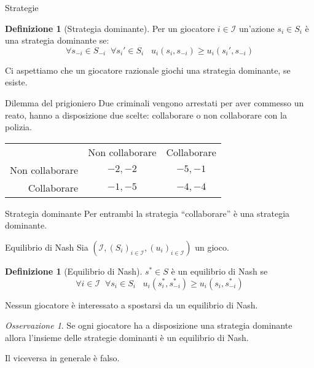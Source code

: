 \documentclass{beamer}
\newcounter{counter1}
\theoremstyle{plain}
\theoremstyle{definition}
\newtheorem{mydef}[counter1]{Definizione}
\theoremstyle{remark}
\newtheorem{myoss}[counter1]{Osservazione}
\newcommand{\pa}[1]{\left(#1\right)}
\begin{document}
\begin{frame}{Strategie}
  \begin{mydef}[Strategia dominante]
    Per un giocatore $i\in\mathcal{I}$ un'azione $s_i\in S_i$ è una
    strategia dominante se:
    \[ \forall s_{-i} \in S_{-i}\;\; \forall s_i' \in S_i\;\;\;
      u_i\pa{s_i,s_{-i}} \ge u_i\pa{s_i',s_{-i}} \]
  \end{mydef}

  Ci aspettiamo che un giocatore razionale giochi una strategia
  dominante, se esiste.
\end{frame}

\begin{frame}{Dilemma del prigioniero}
  Due criminali vengono arrestati per aver commesso un reato, hanno a
  disposizione due scelte: collaborare o non collaborare con la
  polizia.

  \begin{tabular}{rcc}
    & Non collaborare & Collaborare \\
    \cline{2-3}
    Non collaborare & \multicolumn{1}{|c|}{$-2,-2$} & \multicolumn{1}{|c|}{$-5,-1$}  \\
    \cline{2-3}
    Collaborare & \multicolumn{1}{|c|}{$-1,-5$} & \multicolumn{1}{|c|}{$-4,-4$}  \\
    \cline{2-3}
  \end{tabular}

  \begin{block}{Strategia dominante}
    Per entrambi la strategia ``collaborare'' è una strategia dominante.
  \end{block}
\end{frame}

\begin{frame}{Equilibrio di Nash}
  Sia  $\pa{\mathcal{I},\pa{S_i}_{i\in\mathcal{I}},
    \pa{u_i}_{i\in\mathcal{I}}}$ un gioco.
  \begin{mydef}[Equilibrio di Nash]
    $s^* \in S$ è un equilibrio di Nash se
    \[ \forall i\in \mathcal{I}\;\; \forall s_i \in S_i \;\;\;
      u_i\pa{s^*_i,s^*_{-i}} \ge u_i\pa{s_i,s^*_{-i}} \]
  \end{mydef}

  Nessun giocatore è interessato a spostarsi da un equilibrio di Nash.

  \begin{myoss}
    Se ogni giocatore ha a disposizione una strategia dominante allora
    l'insieme delle strategie dominanti è un equilibrio di Nash.

    Il viceversa in generale è falso.
  \end{myoss}
\end{frame}
\end{document}

